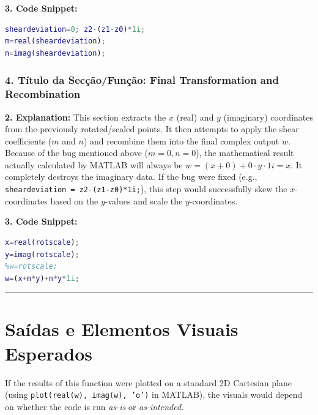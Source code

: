 \textbf{3. Code Snippet:}
\begin{lstlisting}[language=Matlab]
sheardeviation=0; z2-(z1-z0)*1i;
m=real(sheardeviation);
n=imag(sheardeviation);
\end{lstlisting}


\subsubsection*{4. Título da Secção/Função: Final Transformation and Recombination}
\textbf{2. Explanation:} This section extracts the $x$ (real) and $y$ (imaginary) coordinates from the previously rotated/scaled points. It then attempts to apply the shear coefficients ($m$ and $n$) and recombine them into the final complex output $w$. 
Because of the bug mentioned above ($m=0, n=0$), the mathematical result actually calculated by MATLAB will always be $w = (x + 0) + 0 \cdot y \cdot 1i = x$. It completely destroys the imaginary data. If the bug were fixed (e.g., \texttt{sheardeviation = z2-(z1-z0)*1i;}), this step would successfully skew the $x$-coordinates based on the $y$-values and scale the $y$-coordinates.

\textbf{3. Code Snippet:}
\begin{lstlisting}[language=Matlab]
x=real(rotscale);
y=imag(rotscale);
%w=rotscale;
w=(x+m*y)+n*y*1i;
\end{lstlisting}

\vspace{0.5cm}
\hrule
\vspace{0.5cm}

\section*{Saídas e Elementos Visuais Esperados}

If the results of this function were plotted on a standard 2D Cartesian plane (using \texttt{plot(real(w), imag(w), 'o')} in MATLAB), the visuals would depend on whether the code is run \textit{as-is} or \textit{as-intended}.

